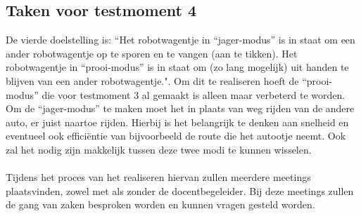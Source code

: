 \subsection{Taken voor testmoment 4}
De vierde doelstelling is: “Het robotwagentje in “jager-modus” is in staat om een ander robotwagentje op te sporen en te vangen (aan te tikken). Het robotwagentje in “prooi-modus” is in staat om (zo lang mogelijk) uit handen te blijven van een ander robotwagentje.". Om dit te realiseren hoeft de “prooi-modus” die voor testmoment 3 al gemaakt is alleen maar verbeterd te worden. Om de “jager-modus” te maken moet het in plaats van weg rijden van de andere auto, er juist naartoe rijden. Hierbij is het belangrijk te denken aan snelheid en eventueel ook efficiëntie van bijvoorbeeld de route die het autootje neemt. Ook zal het nodig zijn makkelijk tussen deze twee modi te kunnen wisselen. 
\\\\
Tijdens het proces van het realiseren hiervan zullen meerdere meetings plaatsvinden, zowel met als zonder de docentbegeleider. Bij deze meetings zullen de gang van zaken besproken worden en kunnen vragen gesteld worden. 
